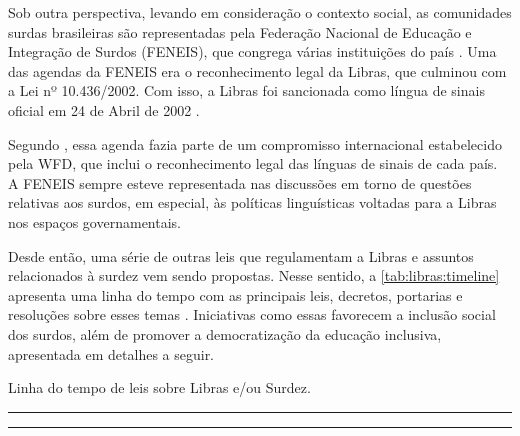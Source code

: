 Sob outra perspectiva, levando em consideração o contexto social, as comunidades surdas brasileiras são representadas pela Federação Nacional de Educação e Integração de Surdos (FENEIS), que congrega várias instituições do país \cite{Quadros2019}. Uma das agendas da FENEIS era o reconhecimento legal da Libras, que culminou com a Lei nº 10.436/2002. Com isso, a Libras foi sancionada como língua de sinais oficial em 24 de Abril de 2002 \cite{Honora2017,Quadros2019,Cristiano2020}.

Segundo , essa agenda fazia parte de um compromisso internacional estabelecido pela WFD, que inclui o reconhecimento legal das línguas de sinais de cada país. A FENEIS sempre esteve representada nas discussões em torno de questões relativas aos surdos, em especial, às políticas linguísticas voltadas para a Libras nos espaços governamentais.

Desde então, uma série de outras leis que regulamentam a Libras e assuntos relacionados à surdez vem sendo propostas. Nesse sentido, a \autoref{tab:libras:timeline} apresenta uma linha do tempo com as principais leis, decretos, portarias e resoluções sobre esses temas \cite{Cristiano2020}. Iniciativas como essas favorecem a inclusão social dos surdos, além de promover a democratização da educação inclusiva, apresentada em detalhes a seguir.

\begin{table}
\caption{Linha do tempo de leis sobre Libras e/ou Surdez.}
\label{tab:libras:timeline}
\centering
\begin{minipage}[t]{0.75\linewidth}
\color{gray}
\rule{\linewidth}{1pt}
\bigskip
\rule{\linewidth}{1pt}%
\end{minipage}%
\fautor
\end{table}

